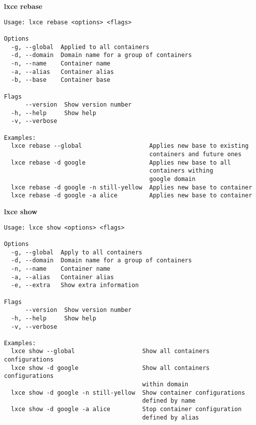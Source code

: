\newpage
\textbf{lxce rebase}
\begin{verbatim}
Usage: lxce rebase <options> <flags>

Options
  -g, --global  Applied to all containers                              
  -d, --domain  Domain name for a group of containers                  
  -n, --name    Container name                                         
  -a, --alias   Container alias                                        
  -b, --base    Container base                               

Flags
      --version  Show version number                                   
  -h, --help     Show help                                             
  -v, --verbose

Examples:
  lxce rebase --global                   Applies new base to existing 
                                         containers and future ones
  lxce rebase -d google                  Applies new base to all
                                         containers withing 
                                         google domain
  lxce rebase -d google -n still-yellow  Applies new base to container 
  lxce rebase -d google -a alice         Applies new base to container 
\end{verbatim}

\newpage
\textbf{lxce show}
\begin{verbatim}
Usage: lxce show <options> <flags>

Options
  -g, --global  Apply to all containers                                
  -d, --domain  Domain name for a group of containers                  
  -n, --name    Container name                                         
  -a, --alias   Container alias                                        
  -e, --extra   Show extra information                

Flags
      --version  Show version number                                   
  -h, --help     Show help                                             
  -v, --verbose

Examples:
  lxce show --global                   Show all containers configurations
  lxce show -d google                  Show all containers configurations 
                                       within domain
  lxce show -d google -n still-yellow  Show container configurations 
                                       defined by name
  lxce show -d google -a alice         Stop container configuration 
                                       defined by alias
\end{verbatim}

